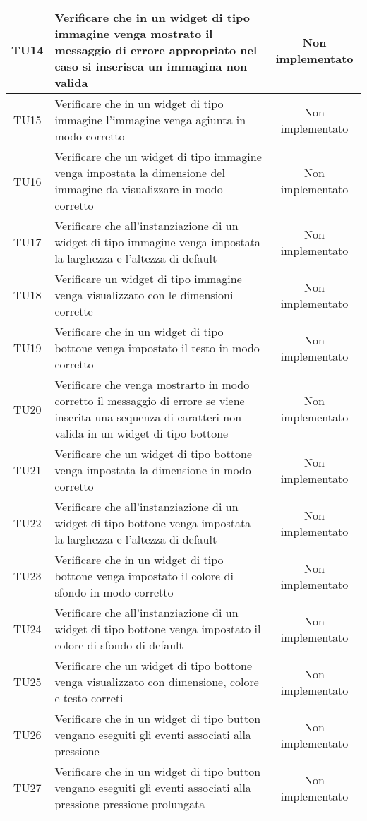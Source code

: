 \begin{center}
\begin{longtable}{|c|>{\centering}m{7cm}|c|}
		TU14 & Verificare che in un widget di tipo immagine venga mostrato il messaggio di errore appropriato nel caso si inserisca un immagina non valida & Non implementato \\ \hline
		TU15 & Verificare che in un widget di tipo immagine l'immagine venga agiunta in modo corretto & Non implementato \\ \hline
		TU16 & Verificare che un widget di tipo immagine venga impostata la dimensione del immagine da visualizzare in modo corretto & Non implementato \\ \hline
		TU17 & Verificare che all'instanziazione di un widget di tipo immagine venga impostata la larghezza e l'altezza di default & Non implementato \\ \hline
		TU18 & Verificare un widget di tipo immagine venga visualizzato con le dimensioni corrette & Non implementato \\ \hline
		TU19 & Verificare che in un widget di tipo bottone venga impostato il testo in modo corretto & Non implementato \\ \hline
		TU20 & Verificare che venga mostrarto in modo corretto il messaggio di errore se viene inserita una sequenza di caratteri non valida in un widget di tipo bottone & Non implementato \\ \hline
		TU21 & Verificare che un widget di tipo bottone venga impostata la dimensione in modo corretto & Non implementato \\ \hline
		TU22 & Verificare che all'instanziazione di un widget di tipo bottone venga impostata la larghezza e l'altezza di default & Non implementato \\ \hline
		TU23 & Verificare che in un widget di tipo bottone venga impostato il colore di sfondo in modo corretto & Non implementato \\ \hline
		TU24 & Verificare che all'instanziazione di un widget di tipo bottone venga impostato il colore di sfondo di default & Non implementato \\ \hline
		TU25 & Verificare che un widget di tipo bottone venga visualizzato con dimensione, colore e testo correti & Non implementato \\ \hline
		TU26 & Verificare che in un widget di tipo button vengano eseguiti gli eventi associati alla pressione & Non implementato \\ \hline
		TU27 & Verificare che in un widget di tipo button vengano eseguiti gli eventi associati alla pressione pressione prolungata & Non implementato \\ \hline

\end{longtable}
\end{center}
